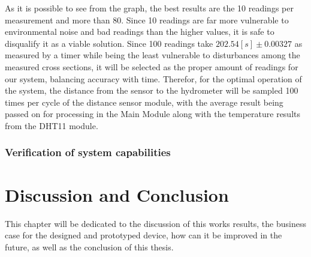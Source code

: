 \documentclass[twoside]{ctuthesis}
\theoremstyle{plain}
\theoremstyle{definition}
\theoremstyle{note}
\begin{document}
As it is possible to see from the graph, the best results are the 10 readings per measurement and more than 80. Since 10 readings are far more vulnerable to environmental noise and bad readings than the higher values, it is safe to disqualify it as a viable solution. Since 100 readings take $202.54[s]\pm0.00327$ as measured by a timer while being the least vulnerable to disturbances among the measured cross sections, it will be selected as the proper amount of readings for our system, balancing accuracy with time.
Therefor, for the optimal operation of the system, the distance from the sensor to the hydrometer will be sampled 100 times per cycle of the distance sensor module, with the average result being passed on for processing in the Main Module along with the temperature results from the DHT11 module.

\subsection{Verification of system capabilities}






\pagebreak 

\begingroup
\renewcommand{\cleardoublepage}{}
\renewcommand{\clearpage}{}
\chapter{Discussion and Conclusion}
\endgroup
This chapter will be dedicated to the discussion of this works results, the business case for the designed and prototyped device, how can it be improved in the future, as well as the conclusion of this thesis.
\end{document}
